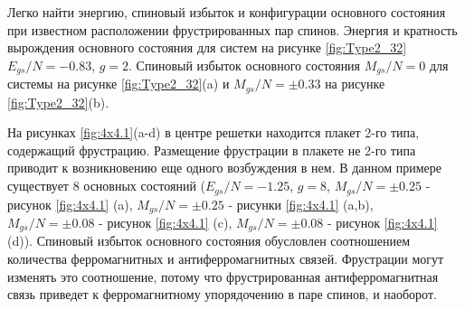 \documentclass[utf8, babel, sor, jor, amsmath, amssymb, reprint]{elsarticle} %
\begin{document}
Легко найти энергию, спиновый избыток и конфигурации основного состояния при известном расположении фрустрированных пар спинов. Энергия и кратность вырождения основного состояния для систем на рисунке \ref{fig:Type2_32} $E_{gs}/N=-0.83$, $g=2$. Спиновый избыток основного состояния $M_{gs}/N=0$ для системы на рисунке \ref{fig:Type2_32}(a) и $M_{gs}/N=\pm 0.33$ на рисунке \ref{fig:Type2_32}(b).


На рисунках \ref{fig:4x4.1}(a-d) в центре решетки находится плакет 2-го типа, содержащий фрустрацию. Размещение фрустрации в плакете не 2-го типа приводит к возникновению еще одного возбуждения в нем. В данном примере существует 8 основных состояний ($E_{gs}/N=-1.25$, $g=8$, $M_{gs}/N=\pm 0.25$ - рисунок \ref{fig:4x4.1} (a), $M_{gs}/N=\pm 0.25$ - рисунки \ref{fig:4x4.1} (a,b), $M_{gs}/N=\pm 0.08$ - рисунок \ref{fig:4x4.1} (c), $M_{gs}/N=\pm 0.08$ - рисунок \ref{fig:4x4.1} (d)). Спиновый избыток основного состояния обусловлен соотношением количества ферромагнитных и антиферромагнитных связей. Фрустрации могут изменять это соотношение, потому что фрустрированная антиферромагнитная связь приведет к ферромагнитному упорядочению в паре спинов, и наоборот.
\end{document}
